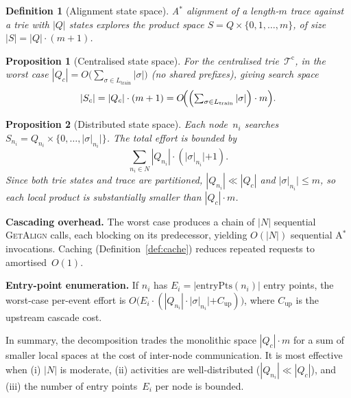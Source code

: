 \documentclass[11pt,a4paper]{article}
\newtheorem{definition}{Definition}
\newtheorem{proposition}{Proposition}
\newcommand{\Nodes}{N}
\newcommand{\T}{\mathcal{T}}
\newcommand{\Tc}{\T^{\mathrm{c}}}
\newcommand{\trace}{\sigma}
\newcommand{\ep}{\mathrm{entryPts}}
\newcommand{\GA}{\textsc{GetAlign}}
\begin{document}
\begin{definition}[Alignment state space]\label{def:state-space}
  A$^{*}$ alignment of a length-$m$ trace against a trie with $|Q|$
  states explores the product space
  $S = Q \times \{0, 1, \ldots, m\}$,
  of size $|S| = |Q| \cdot (m+1)$.
\end{definition}

\begin{proposition}[Centralised state space]\label{prop:central-space}
  For the centralised trie~$\Tc$, in the worst case
  $|Q_c| = O\!\bigl(\sum_{\trace \in L_{\mathrm{train}}} |\trace|\bigr)$
  (no shared prefixes), giving search space
  \[
    |S_c|
    = |Q_c| \cdot (m+1)
    = O\!\Bigl(
        \Bigl(\textstyle\sum_{\trace \in L_{\mathrm{train}}} |\trace|\Bigr)
        \cdot m
      \Bigr).
  \]
\end{proposition}

\begin{proposition}[Distributed state space]\label{prop:dist-space}
  Each node~$n_i$ searches
  $S_{n_i} = Q_{n_i} \times \{0, \ldots, |\trace|_{n_i}|\}$.
  The total effort is bounded by
  \[
    \textstyle\sum_{n_i \in \Nodes}
      |Q_{n_i}| \cdot (|\trace|_{n_i}| + 1).
  \]
  Since both trie states and trace are partitioned,
  $|Q_{n_i}| \ll |Q_c|$ and $|\trace|_{n_i}| \leq m$, so each local
  product is substantially smaller than $|Q_c| \cdot m$.
\end{proposition}

\medskip\noindent
\textbf{Cascading overhead.}\;
The worst case produces a chain of $|\Nodes|$ sequential \GA{} calls,
each blocking on its predecessor, yielding $O(|\Nodes|)$ sequential
A$^{*}$ invocations.
Caching (Definition~\ref{def:cache}) reduces repeated requests to
amortised~$O(1)$.

\medskip\noindent
\textbf{Entry-point enumeration.}\;
If $n_i$ has $E_i = |\ep(n_i)|$ entry points, the worst-case per-event
effort is
$O\bigl(E_i \cdot (|Q_{n_i}| \cdot |\trace|_{n_i}|
  + C_{\mathrm{up}})\bigr)$,
where $C_{\mathrm{up}}$ is the upstream cascade cost.

\medskip\noindent
In summary, the decomposition trades the monolithic space
$|Q_c| \cdot m$ for a sum of smaller local spaces at the cost of
inter-node communication.  It is most effective when
(i) $|\Nodes|$ is moderate,
(ii) activities are well-distributed ($|Q_{n_i}| \ll |Q_c|$), and
(iii) the number of entry points~$E_i$ per node is bounded.
\end{document}
